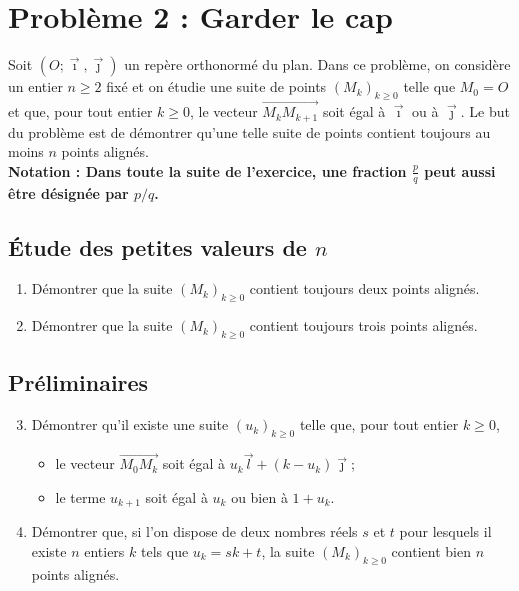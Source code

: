\documentclass[landscape,twocolumn,leqno,a4paper,10pt]{report} %
\newcommand\n{\noindent}
\renewcommand{\geq}{\geqslant}
\renewcommand{\textbf}[1]{\begingroup\bfseries\mathversion{bold}#1\endgroup}		%
\begin{document}
\section{Problème 2 : Garder le cap}


\n Soit $\left(O ; \vec{\imath}, \vec{\jmath}\right)$ un repère orthonormé du plan. Dans ce problème, on considère un entier $n \geq 2$ fixé et on étudie une suite de points $\left(M_{k}\right)_{k \geq 0}$ telle que $M_{0}=O$ et que, pour tout entier $k \geq 0$, le vecteur $\overrightarrow{M_{k} M_{k+1}}$ soit égal à $\vec{\imath}$ ou à $\vec{\jmath}$. Le but du problème est de démontrer qu'une telle suite de points contient toujours au moins $n$ points alignés.\\

\n \textbf{Notation :} Dans toute la suite de l'exercice, une fraction $\frac{p}{q}$ peut aussi être désignée par $p / q$.

\subsection{Étude des petites valeurs de $n$}


\begin{enumerate}
	\item Démontrer que la suite $\left(M_{k}\right)_{k \geq 0}$ contient toujours deux points alignés.
	\item Démontrer que la suite $\left(M_{k}\right)_{k \geq 0}$ contient toujours trois points alignés.
\end{enumerate}


\subsection{Préliminaires}

\begin{enumerate}\setcounter{enumi}{2}
	\item Démontrer qu'il existe une suite $\left(u_{k}\right)_{k \geq 0}$ telle que, pour tout entier $k \geq 0$,
	\begin{itemize}
		\item[$\triangleright$] le vecteur $\overrightarrow{M_{0} M_{k}}$ soit égal à $u_{k} \vec{l}+\left(k-u_{k}\right) \vec{\jmath}$;
		\item[$\triangleright$] le terme $u_{k+1}$ soit égal à $u_{k}$ ou bien à $1+u_{k}$.
	\end{itemize}
	\item Démontrer que, si l'on dispose de deux nombres réels $s$ et $t$ pour lesquels il existe $n$ entiers $k$ tels que $u_{k}=s k+t$, la suite $\left(M_{k}\right)_{k \geq 0}$ contient bien $n$ points alignés.
\end{enumerate}
\end{document}
